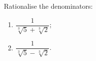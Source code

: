 Rationalise the denominators:
\begin{enumerate}
\item[(a)] $\dfrac{1}{\sqrt[3]{5}+\sqrt[3]{2}}$;
\item[(b)] $\dfrac{1}{\sqrt[3]{5}-\sqrt[3]{2}}$.
\end{enumerate}
